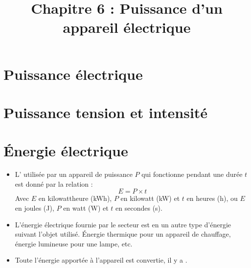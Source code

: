 \documentclass[xcolor={dvipsnames}]{beamer}
\title{Chapitre 6 : Puissance d'un appareil électrique}
\begin{document}
\begin{frame}
  \titlepage 
\end{frame}

\section{Puissance électrique}

\begin{frame}

\end{frame}

%		

\section{Puissance tension et intensité}



\begin{frame}

\end{frame}
\section{\'Energie électrique}


\begin{frame}

	\begin{mybilan}
		\begin{itemize}
		\item L' utilisée par un appareil de puissance $P$ 	qui fonctionne pendant une durée $t$ est donné par la relation :
		\begin{equation*}
		E = P \times t
		\end{equation*}
		Avec $E$ en kilowattheure (kWh), $P$ en kilowatt (kW) et $t$ en heures (h), ou  $E$ en joules (J), $P$ en watt (W) et $t$ en secondes (s).\pause
		
		
		
		\item L'énergie électrique fournie par le secteur est  en un autre type d'énergie suivant l'objet utilisé. \'Energie thermique pour un appareil de chauffage, énergie lumineuse pour une lampe, etc.\pause
		
		\item Toute l'énergie apportée à l'appareil est convertie, il y a .
	\end{itemize}
	\end{mybilan}
\end{frame}
\end{document}
